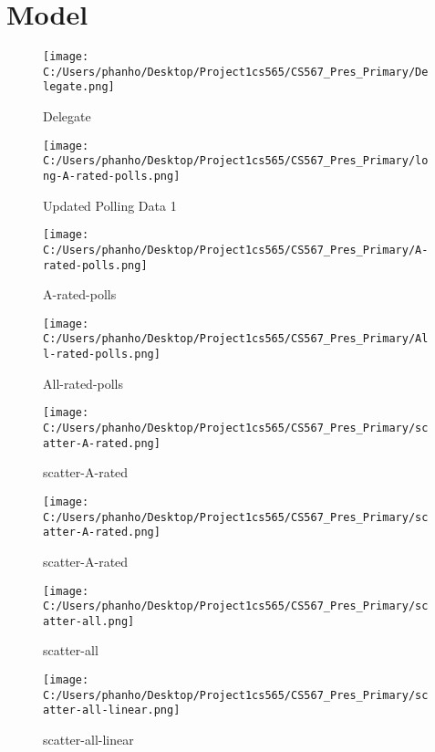 \section{Model}\label{model}
\begin{figure}[H]
    \centering
    \texttt{[image: C:/Users/phanho/Desktop/Project1cs565/CS567\_Pres\_Primary/Delegate.png]}
    \caption{Delegate}
    \label{Delegate}
\end{figure}
\begin{figure}[H]
    \centering
    \texttt{[image: C:/Users/phanho/Desktop/Project1cs565/CS567\_Pres\_Primary/long-A-rated-polls.png]}
    \caption{Updated Polling Data 1 }
    \label{Updated-Polling-Data-1}
\end{figure}
\begin{figure}[H]
    \centering
    \texttt{[image: C:/Users/phanho/Desktop/Project1cs565/CS567\_Pres\_Primary/A-rated-polls.png]}
    \caption{A-rated-polls}
    \label{A-rated-polls}
\end{figure}
\begin{figure}[H]
    \centering
    \texttt{[image: C:/Users/phanho/Desktop/Project1cs565/CS567\_Pres\_Primary/All-rated-polls.png]}
    \caption{All-rated-polls}
    \label{All-rated-polls}
\end{figure}
\begin{figure}[H]
    \centering
    \texttt{[image: C:/Users/phanho/Desktop/Project1cs565/CS567\_Pres\_Primary/scatter-A-rated.png]}
    \caption{scatter-A-rated}
    \label{scatter-A-rated}
\end{figure}
\begin{figure}[H]
    \centering
    \texttt{[image: C:/Users/phanho/Desktop/Project1cs565/CS567\_Pres\_Primary/scatter-A-rated.png]}
    \caption{scatter-A-rated}
    \label{scatter-A-rated}
\end{figure}
\begin{figure}[H]
    \centering
    \texttt{[image: C:/Users/phanho/Desktop/Project1cs565/CS567\_Pres\_Primary/scatter-all.png]}
    \caption{scatter-all}
    \label{scatter-all}
\end{figure}
\begin{figure}[H]
    \centering
    \texttt{[image: C:/Users/phanho/Desktop/Project1cs565/CS567\_Pres\_Primary/scatter-all-linear.png]}
    \caption{scatter-all-linear}
    \label{scatter-all-linear}
\end{figure}
